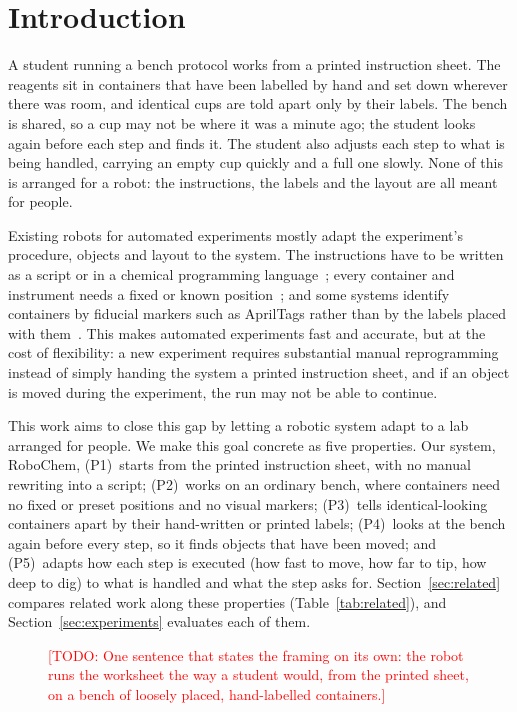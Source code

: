 \documentclass[letterpaper, 10pt, journal, twoside]{IEEEtran}}
\newcommand{\todo}[1]{\textcolor{red}{[TODO: #1]}}
\newcommand{\placeholderfig}[3]{%
  \fbox{\parbox[c][#2][c]{#1}{\centering\footnotesize\textcolor{gray}{#3}}}}
\newcommand{\sysname}{RoboChem}   %
\begin{document}
\section{Introduction}
\label{sec:intro}
A student running a bench protocol works from a printed instruction sheet.
The reagents sit in containers that have been labelled by hand and set down
wherever there was room, and identical cups are told apart only by their
labels. The bench is shared, so a cup may not be where it was a minute ago;
the student looks again before each step and finds it. The student also
adjusts each step to what is being handled, carrying an empty cup quickly and
a full one slowly. None of this is arranged for a robot: the instructions,
the labels and the layout are all meant for people. 

Existing robots for automated experiments mostly adapt the experiment's
procedure, objects and layout to the system. The instructions have to be
written as a script or in a chemical programming
language~\cite{steiner2019organic,mehr2020universal,fakhruldeen2022archemist};
every container and instrument needs a fixed or known
position~\cite{burger2020mobile,dai2024autonomous}; and some systems
identify containers by fiducial markers such as AprilTags rather than by
the labels placed with them~\cite{yoshikawa2022chemistry}. This makes
automated experiments fast and accurate, but at the cost of flexibility: a
new experiment requires substantial manual reprogramming instead of simply
handing the system a printed instruction sheet, and if an object is moved
during the experiment, the run may not be able to continue.

This work aims to close this gap by letting a robotic system adapt to a lab
arranged for people. We make this goal concrete as five properties. Our system,   \sysname{}, (P1)~starts from the printed instruction sheet, with no manual
rewriting into a script; (P2)~works on an ordinary bench, where containers
need no fixed or preset positions and no visual markers; (P3)~tells
identical-looking containers apart by their hand-written or printed labels;
(P4)~looks at the bench again before every step, so it finds objects that
have been moved; and (P5)~adapts how each step is executed (how fast to move, how far to tip, how deep to dig) to what is handled and what the step asks for. Section~\ref{sec:related}
compares related work along these properties (Table~\ref{tab:related}), and
Section~\ref{sec:experiments} evaluates each of them.

\begin{figure}[t]
  \centering
  \placeholderfig{0.95\columnwidth}{4.2cm}{Teaser: the printed sheet
  (left) $\rightarrow$ the robot at a bench of loosely placed,
  hand-labelled cups (centre) $\rightarrow$ the finished experiment
  (right)}
  \caption{\todo{One sentence that states the framing on its own: the
  robot runs the worksheet the way a student would, from the printed
  sheet, on a bench of loosely placed, hand-labelled containers.}}
  \label{fig:teaser}
\end{figure}
\end{document}
